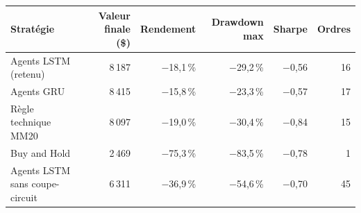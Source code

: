\begin{tabular}{lrrrrr}\toprule
Stratégie & Valeur finale (\$) & Rendement & Drawdown max & Sharpe & Ordres \\\midrule
Agents LSTM (retenu) & 8\,187 & $-$18,1\,\% & $-$29,2\,\% & $-$0,56 & 16 \\
Agents GRU & 8\,415 & $-$15,8\,\% & $-$23,3\,\% & $-$0,57 & 17 \\
Règle technique MM20 & 8\,097 & $-$19,0\,\% & $-$30,4\,\% & $-$0,84 & 15 \\
Buy and Hold & 2\,469 & $-$75,3\,\% & $-$83,5\,\% & $-$0,78 & 1 \\
Agents LSTM sans coupe-circuit & 6\,311 & $-$36,9\,\% & $-$54,6\,\% & $-$0,70 & 45 \\
\bottomrule\end{tabular}
